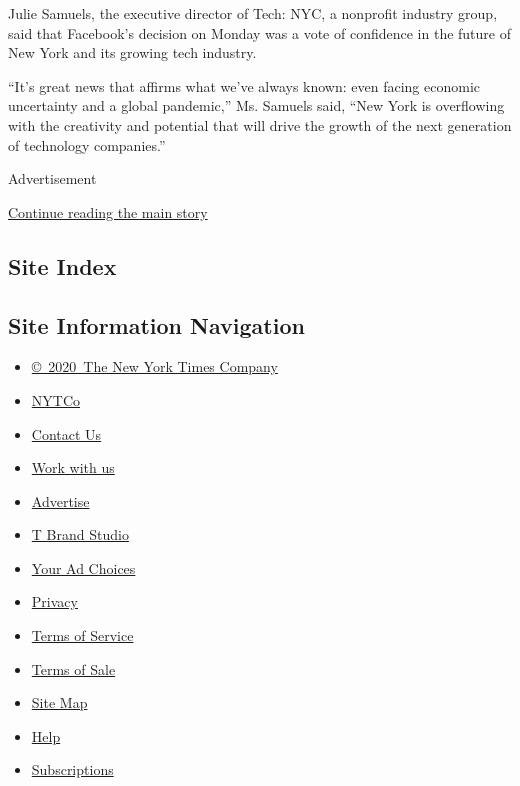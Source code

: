 Julie Samuels, the executive director of Tech: NYC, a nonprofit industry
group, said that Facebook's decision on Monday was a vote of confidence
in the future of New York and its growing tech industry.

``It's great news that affirms what we've always known: even facing
economic uncertainty and a global pandemic,'' Ms. Samuels said, ``New
York is overflowing with the creativity and potential that will drive
the growth of the next generation of technology companies.''

Advertisement

\protect\hyperlink{after-bottom}{Continue reading the main story}

\hypertarget{site-index}{%
\subsection{Site Index}\label{site-index}}

\hypertarget{site-information-navigation}{%
\subsection{Site Information
Navigation}\label{site-information-navigation}}

\begin{itemize}
\tightlist
\item
  \href{https://help.nytimes.com/hc/en-us/articles/115014792127-Copyright-notice}{©~2020~The
  New York Times Company}
\end{itemize}

\begin{itemize}
\tightlist
\item
  \href{https://www.nytco.com/}{NYTCo}
\item
  \href{https://help.nytimes.com/hc/en-us/articles/115015385887-Contact-Us}{Contact
  Us}
\item
  \href{https://www.nytco.com/careers/}{Work with us}
\item
  \href{https://nytmediakit.com/}{Advertise}
\item
  \href{http://www.tbrandstudio.com/}{T Brand Studio}
\item
  \href{https://www.nytimes.com/privacy/cookie-policy\#how-do-i-manage-trackers}{Your
  Ad Choices}
\item
  \href{https://www.nytimes.com/privacy}{Privacy}
\item
  \href{https://help.nytimes.com/hc/en-us/articles/115014893428-Terms-of-service}{Terms
  of Service}
\item
  \href{https://help.nytimes.com/hc/en-us/articles/115014893968-Terms-of-sale}{Terms
  of Sale}
\item
  \href{https://spiderbites.nytimes.com}{Site Map}
\item
  \href{https://help.nytimes.com/hc/en-us}{Help}
\item
  \href{https://www.nytimes.com/subscription?campaignId=37WXW}{Subscriptions}
\end{itemize}
